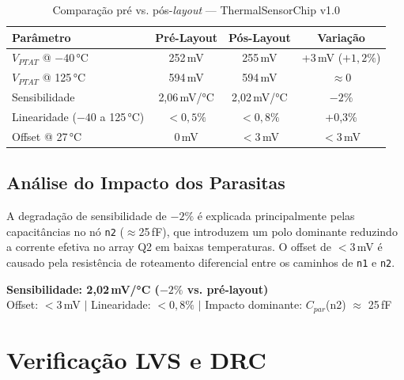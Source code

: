\documentclass[12pt,a4paper]{article}
\begin{document}
\begin{table}[h!]
\centering
\caption{Comparação pré vs. pós-\textit{layout} --- ThermalSensorChip v1.0}
\label{tab:pre_post}
\begin{tabular}{lccc}
\toprule
\textbf{Parâmetro} & \textbf{Pré-Layout} & \textbf{Pós-Layout} & \textbf{Variação} \\
\midrule
$V_{PTAT}$ @ $-40$\,°C      & 252\,mV   & 255\,mV   & +3\,mV ($+1{,}2\%$) \\
$V_{PTAT}$ @ 125\,°C        & 594\,mV   & 594\,mV   & $\approx$0 \\
Sensibilidade                & 2,06\,mV/°C & 2,02\,mV/°C & $-2\%$ \\
Linearidade ($-40$ a 125\,°C) & $<0{,}5\%$ & $<0{,}8\%$ & +0,3\% \\
Offset @ 27\,°C             & 0\,mV     & $<3$\,mV  & $<3$\,mV \\
\bottomrule
\end{tabular}
\end{table}

\subsection{Análise do Impacto dos Parasitas}

A degradação de sensibilidade de $-2\%$ é explicada principalmente pelas capacitâncias
no nó \texttt{n2} ($\approx$25\,fF), que introduzem um polo dominante reduzindo a corrente
efetiva no array Q2 em baixas temperaturas. O offset de $<3$\,mV é causado pela resistência
de roteamento diferencial entre os caminhos de \texttt{n1} e \texttt{n2}.

\begin{resultbox}
\begin{center}
\textbf{Sensibilidade: 2,02\,mV/°C ($-2\%$ vs. pré-layout)} \\[4pt]
\small Offset: $<3$\,mV $|$ Linearidade: $<0{,}8\%$ $|$
Impacto dominante: $C_{par}$(n2) $\approx$ 25\,fF
\end{center}
\end{resultbox}

\section{Verificação LVS e DRC}
\end{document}
